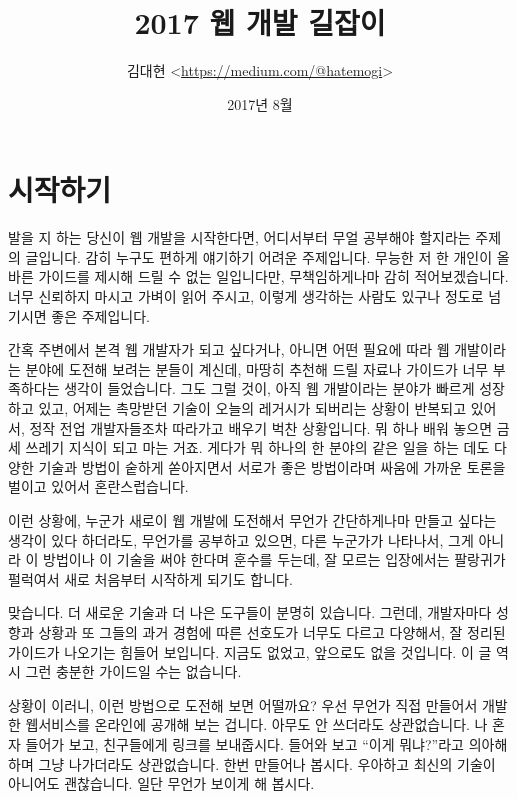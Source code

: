 \documentclass[11pt,a4paper]{article}
\begin{document}
\title{2017 웹 개발 길잡이}
\author{김대현 <\url{https://medium.com/@hatemogi}>}
\date{2017년 8월}
\maketitle
\section{시작하기}

발을 지 하는 당신이 웹 개발을 시작한다면, 어디서부터 무얼 공부해야 할지라는 주제의 글입니다. 감히 누구도 편하게 얘기하기 어려운 주제입니다. 무능한 저 한 개인이 올바른 가이드를 제시해 드릴 수 없는 일입니다만, 무책임하게나마 감히 적어보겠습니다. 너무 신뢰하지 마시고 가벼이 읽어 주시고, 이렇게 생각하는 사람도 있구나 정도로 넘기시면 좋은 주제입니다.

\textsf{간혹 주변에서 본격 웹 개발자가 되고 싶다}거나, 아니면 어떤 필요에 따라 웹 개발이라는 분야에 도전해 보려는 분들이 계신데, 마땅히 추천해 드릴 자료나 가이드가 너무 부족하다는 생각이 들었습니다. 그도 그럴 것이, 아직 웹 개발이라는 분야가 빠르게 성장하고 있고, 어제는 촉망받던 기술이 오늘의 레거시가 되버리는 상황이 반복되고 있어서, 정작 전업 개발자들조차 따라가고 배우기 벅찬 상황입니다. 뭐 하나 배워 놓으면 금세 쓰레기 지식이 되고 마는 거죠. 게다가 뭐 하나의 한 분야의 같은 일을 하는 데도 다양한 기술과 방법이 숱하게 쏟아지면서 서로가 좋은 방법이라며 싸움에 가까운 토론을 벌이고 있어서 혼란스럽습니다.

이런 상황에, 누군가 새로이 웹 개발에 도전해서 무언가 간단하게나마 만들고 싶다는 생각이 있다 하더라도, 무언가를 공부하고 있으면, 다른 누군가가 나타나서, 그게 아니라 이 방법이나 이 기술을 써야 한다며 훈수를 두는데, 잘 모르는 입장에서는 팔랑귀가 펄럭여서 새로 처음부터 시작하게 되기도 합니다.

맞습니다. 더 새로운 기술과 더 나은 도구들이 분명히 있습니다. 그런데, 개발자마다 성향과 상황과 또 그들의 과거 경험에 따른 선호도가 너무도 다르고 다양해서, 잘 정리된 가이드가 나오기는 힘들어 보입니다. 지금도 없었고, 앞으로도 없을 것입니다. 이 글 역시 그런 충분한 가이드일 수는 없습니다.

상황이 이러니, 이런 방법으로 도전해 보면 어떨까요? 우선 무언가 직접 만들어서 개발한 웹서비스를 온라인에 공개해 보는 겁니다. 아무도 안 쓰더라도 상관없습니다. 나 혼자 들어가 보고, 친구들에게 링크를 보내줍시다. 들어와 보고 ``이게 뭐냐?''라고 의아해하며 그냥 나가더라도 상관없습니다. 한번 만들어나 봅시다. 우아하고 최신의 기술이 아니어도 괜찮습니다. 일단 무언가 보이게 해 봅시다.
\end{document}
